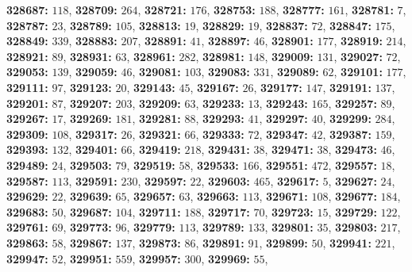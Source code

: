 \textsf{\bfseries 328687:} $118$, \textsf{\bfseries 328709:} $264$, \textsf{\bfseries 328721:} $176$, \textsf{\bfseries 328753:} $188$, \textsf{\bfseries 328777:} $161$, \textsf{\bfseries 328781:} $7$, \textsf{\bfseries 328787:} $23$, \textsf{\bfseries 328789:} $105$, \textsf{\bfseries 328813:} $19$, \textsf{\bfseries 328829:} $19$, \textsf{\bfseries 328837:} $72$, \textsf{\bfseries 328847:} $175$, \textsf{\bfseries 328849:} $339$, \textsf{\bfseries 328883:} $207$, \textsf{\bfseries 328891:} $41$, \textsf{\bfseries 328897:} $46$, \textsf{\bfseries 328901:} $177$, \textsf{\bfseries 328919:} $214$, \textsf{\bfseries 328921:} $89$, \textsf{\bfseries 328931:} $63$, \textsf{\bfseries 328961:} $282$, \textsf{\bfseries 328981:} $148$, \textsf{\bfseries 329009:} $131$, \textsf{\bfseries 329027:} $72$, \textsf{\bfseries 329053:} $139$, \textsf{\bfseries 329059:} $46$, \textsf{\bfseries 329081:} $103$, \textsf{\bfseries 329083:} $331$, \textsf{\bfseries 329089:} $62$, \textsf{\bfseries 329101:} $177$, \textsf{\bfseries 329111:} $97$, \textsf{\bfseries 329123:} $20$, \textsf{\bfseries 329143:} $45$, \textsf{\bfseries 329167:} $26$, \textsf{\bfseries 329177:} $147$, \textsf{\bfseries 329191:} $137$, \textsf{\bfseries 329201:} $87$, \textsf{\bfseries 329207:} $203$, \textsf{\bfseries 329209:} $63$, \textsf{\bfseries 329233:} $13$, \textsf{\bfseries 329243:} $165$, \textsf{\bfseries 329257:} $89$, \textsf{\bfseries 329267:} $17$, \textsf{\bfseries 329269:} $181$, \textsf{\bfseries 329281:} $88$, \textsf{\bfseries 329293:} $41$, \textsf{\bfseries 329297:} $40$, \textsf{\bfseries 329299:} $284$, \textsf{\bfseries 329309:} $108$, \textsf{\bfseries 329317:} $26$, \textsf{\bfseries 329321:} $66$, \textsf{\bfseries 329333:} $72$, \textsf{\bfseries 329347:} $42$, \textsf{\bfseries 329387:} $159$, \textsf{\bfseries 329393:} $132$, \textsf{\bfseries 329401:} $66$, \textsf{\bfseries 329419:} $218$, \textsf{\bfseries 329431:} $38$, \textsf{\bfseries 329471:} $38$, \textsf{\bfseries 329473:} $46$, \textsf{\bfseries 329489:} $24$, \textsf{\bfseries 329503:} $79$, \textsf{\bfseries 329519:} $58$, \textsf{\bfseries 329533:} $166$, \textsf{\bfseries 329551:} $472$, \textsf{\bfseries 329557:} $18$, \textsf{\bfseries 329587:} $113$, \textsf{\bfseries 329591:} $230$, \textsf{\bfseries 329597:} $22$, \textsf{\bfseries 329603:} $465$, \textsf{\bfseries 329617:} $5$, \textsf{\bfseries 329627:} $24$, \textsf{\bfseries 329629:} $22$, \textsf{\bfseries 329639:} $65$, \textsf{\bfseries 329657:} $63$, \textsf{\bfseries 329663:} $113$, \textsf{\bfseries 329671:} $108$, \textsf{\bfseries 329677:} $184$, \textsf{\bfseries 329683:} $50$, \textsf{\bfseries 329687:} $104$, \textsf{\bfseries 329711:} $188$, \textsf{\bfseries 329717:} $70$, \textsf{\bfseries 329723:} $15$, \textsf{\bfseries 329729:} $122$, \textsf{\bfseries 329761:} $69$, \textsf{\bfseries 329773:} $96$, \textsf{\bfseries 329779:} $113$, \textsf{\bfseries 329789:} $133$, \textsf{\bfseries 329801:} $35$, \textsf{\bfseries 329803:} $217$, \textsf{\bfseries 329863:} $58$, \textsf{\bfseries 329867:} $137$, \textsf{\bfseries 329873:} $86$, \textsf{\bfseries 329891:} $91$, \textsf{\bfseries 329899:} $50$, \textsf{\bfseries 329941:} $221$, \textsf{\bfseries 329947:} $52$, \textsf{\bfseries 329951:} $559$, \textsf{\bfseries 329957:} $300$, \textsf{\bfseries 329969:} $55$, 

